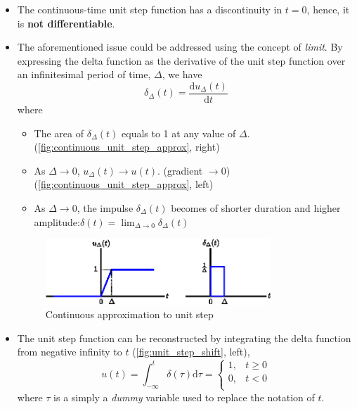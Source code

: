 \begin{itemize}
    \item The continuous-time unit step function has a discontinuity in $t=0$, hence, it is \textbf{not differentiable}. 
    
    \item The aforementioned issue could be addressed using the concept of \textit{limit}. By expressing the delta function as the derivative of the unit step function over an infinitesimal period of time, $\Delta$, we have
    \[
        \delta_{\Delta}(t) = \frac{\mathrm{d}u_{\Delta}(t)}{\mathrm{d}t} 
    \]
    where
    \begin{itemize}
        \item The area of $\delta_{\Delta}(t)$ equals to 1 at any value of $\Delta$.(\autoref{fig:continuous_unit_step_approx}, right)
        \item As $\Delta \rightarrow 0$, $u_{\Delta}(t) \rightarrow u(t)$. (gradient $\to 0$) (\autoref{fig:continuous_unit_step_approx}, left)
        \item As $\Delta \rightarrow 0$, the impulse $\delta_{\Delta}(t)$ becomes of shorter duration and higher amplitude:$\delta(t) = \lim_{\Delta \to 0} \delta_{\Delta}(t)$
    \end{itemize}
    \begin{figure}[h] 
        \centering 
        \includegraphics[width=0.8\textwidth]{images/delta_approx.eps}
        \caption{Continuous approximation to unit step}
        \label{fig:continuous_unit_step_approx}
    \end{figure}
    
    \item The unit step function can be reconstructed by integrating the delta function from negative infinity to $t$ (\autoref{fig:unit_step_shift}, left),
    \[
        u(t) = \int_{-\infty}^{t} \delta(\tau) \mathrm{d}\tau
        = 
        \begin{cases}
            1, & t \geq 0 \\
            0, & t < 0 \\
        \end{cases}
    \]
    where $\tau$ is a simply a \textit{dummy} variable used to replace the notation of $t$.
    

\end{itemize}

